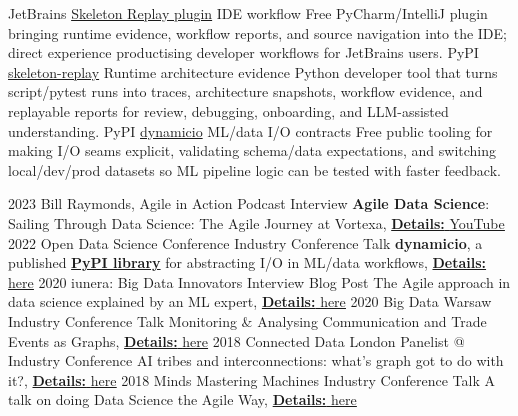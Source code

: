 \documentclass[]{../../../../friggeri-cv}
\begin{document}
\begin{entrylist2}
	\entrytwo
		{\small JetBrains}
		{\small \href{https://plugins.jetbrains.com/plugin/32807-skeleton-replay}{Skeleton Replay plugin}}
		{\small IDE workflow}
		{\footnotesize Free PyCharm/IntelliJ plugin bringing runtime evidence, workflow reports, and source navigation into the IDE; direct experience productising developer workflows for JetBrains users.}
	\entrytwo
		{\small PyPI}
		{\small \href{https://pypi.org/project/skeleton-replay/}{skeleton-replay}}
		{\small Runtime architecture evidence}
		{\footnotesize Python developer tool that turns script/pytest runs into traces, architecture snapshots, workflow evidence, and replayable reports for review, debugging, onboarding, and LLM-assisted understanding.}
	\entrytwo
		{\small PyPI}
		{\small \href{https://pypi.org/project/dynamicio/}{dynamicio}}
		{\small ML/data I/O contracts}
		{\footnotesize Free public tooling for making I/O seams explicit, validating schema/data expectations, and switching local/dev/prod datasets so ML pipeline logic can be tested with faster feedback.}
\end{entrylist2}
\begin{entrylist2}
	\entrytwo
		{\small 2023}
		{\small Bill Raymonds, Agile in Action}
		{\small Podcast Interview}
		{\small \textbf{Agile Data Science}: Sailing Through Data Science: The Agile Journey at Vortexa, \underline{\textbf{Details:} \href{https://christos-hadjinikolis.github.io//2023/10/31/Agile-In-Action.html}{YouTube}}}
	\entrytwo
		{\small 2022}
		{\small Open Data Science Conference}
		{\small Industry Conference Talk}
		{\small \textbf{dynamicio}, a published \href{https://pypi.org/project/dynamicio/}{\textbf{PyPI library}} for abstracting I/O in ML/data workflows, \underline{\textbf{Details:} \href{https://odsc.com/speakers/dynamicio-a-pandas-i-o-wrapper-why-you-should-start-your-ml-ops-journey-with-wrapping-your-i-o/}{here}}}
	\entrytwo
		{\small 2020}
		{\small iunera: Big Data Innovators}
		{\small Interview Blog Post}
		{\small The Agile approach in data science explained by an ML expert, \underline{\textbf{Details:} \href{https://www.iunera.com/kraken/interviews/the-agile-approach-in-data-science-explained-by-an-ml-expert/}{here}}}
	\entrytwo
		{\small 2020}
		{\small Big Data Warsaw}
		{\small Industry Conference Talk}
		{\small Monitoring \& Analysing Communication and Trade Events as Graphs, \underline{\textbf{Details:} \href{https://bigdatatechwarsaw.eu/agenda/}{here}}}
	\entrytwo
		{\small 2018}
		{\small Connected Data London}
		{\small Panelist @ Industry Conference}
		{\small AI tribes and interconnections: what's graph got to do with it?, \underline{\textbf{Details:} \href{http://connected-data.london/2018/09/23/ai-tribes-and-interconnections-whats-graph-got-to-do-with-it/}{here}}}
	\entrytwo
		{\small 2018}
		{\small Minds Mastering Machines}
		{\small Industry Conference Talk}
		{\small A talk on doing Data Science the Agile Way, \underline{\textbf{Details:} \href{https://2018.mcubed.london/sessions/data-science-agile-way/}{here}}}
\end{entrylist2}
\end{document}
